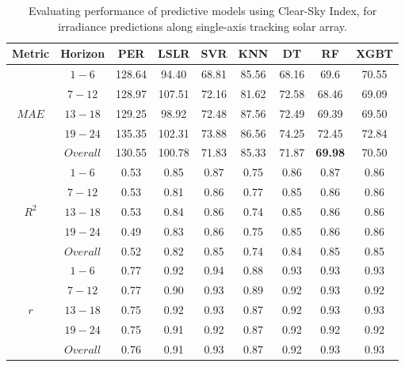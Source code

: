\begin{table}[h]
\begin{center}
    \caption{Evaluating performance of predictive models using Clear-Sky Index, for irradiance predictions along single-axis tracking solar array.}
    \vspace{0.2cm}
    \label{Tab:mmb_array_e}
    \begin{tabular}{ccccccccc}
    \toprule
    \textbf{Metric} & \textbf{Horizon} & \textbf{PER} & \textbf{LSLR} & \textbf{SVR} & \textbf{KNN} & \textbf{DT} & \textbf{RF} & \textbf{XGBT} \\
    \midrule
    \multirow{5}{*}{$MAE$} & $1 - 6$ & 128.64 & 94.40   & 68.81 & 85.56 & 68.16 & 69.6 & 70.55 \\
                             & $7 - 12$ & 128.97 & 107.51 & 72.16 & 81.62 & 72.58 & 68.46 & 69.09 \\
                             & $13 - 18$ & 129.25 & 98.92  & 72.48 & 87.56 & 72.49 & 69.39 & 69.50 \\
                             & $19 - 24$ & 135.35 & 102.31 & 73.88 & 86.56 & 74.25 & 72.45 & 72.84\\
                             & $Overall$ & 130.55 & 100.78 & 71.83 & 85.33 & 71.87 & \textbf{69.98} & 70.50 \\ 
    \midrule
    \multirow{5}{*}{$R^2$} & $1 - 6$ & 0.53 & 0.85   & 0.87  & 0.75  & 0.86  & 0.87 & 0.86 \\
                             & $7 - 12$ & 0.53 & 0.81   & 0.86  & 0.77  & 0.85  & 0.86 & 0.86 \\
                             & $13 - 18$ & 0.53 & 0.84   & 0.86  & 0.74  & 0.85  & 0.86 & 0.86 \\
                             & $19 - 24$ & 0.49 & 0.83   & 0.86  & 0.75  & 0.85  & 0.86 & 0.86 \\ 
                             & $Overall$ & 0.52 & 0.82   & 0.85  & 0.74  & 0.84  & 0.85 & 0.85 \\
    \midrule
    \multirow{5}{*}{$r$}    & $1 - 6$ & 0.77 & 0.92 & 0.94  & 0.88  & 0.93  & 0.93 & 0.93  \\
                            & $7 - 12$ & 0.77 & 0.90 & 0.93  & 0.89  & 0.92  & 0.93 & 0.92  \\
                            & $13 - 18$ & 0.75 & 0.92 & 0.93  & 0.87  & 0.92  & 0.93 & 0.93  \\
                            & $19 - 24$ & 0.75 & 0.91 & 0.92  & 0.87  & 0.92  & 0.92 & 0.92  \\
                            & $Overall$ & 0.76 & 0.91 & 0.93  & 0.87  & 0.92  & 0.93 & 0.93   \\
    \bottomrule
    \end{tabular}
\end{center}
\end{table}


